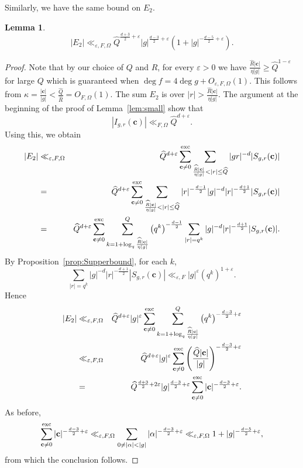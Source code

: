 \documentclass[10pt]{amsart}
\theoremstyle{plain}
\theoremstyle{plain}
\newtheorem{lemma}[theorem]{Lemma}
\renewcommand{\vec}[1]{\mathbf{#1}}
\theoremstyle{remark}
\theoremstyle{definition}
\newcommand{\hQ}{\widehat{Q}}
\newcommand{\hR}{\widehat{R}}
\newcommand{\exc}{\textup{exc}}
\begin{document}
Similarly, we have the same bound on $E_2$.
\begin{lemma}\label{lem:e2}
\[|E_2|\ll_{\varepsilon,F,\Omega} \hQ^{\frac{d+3}{2}+\varepsilon}|g|^{\frac{d-3}{2}+\varepsilon}(1+|g|^{-\frac{d-5}{2}+\varepsilon}).\]
\end{lemma}
\begin{proof}
Note that by our choice of $Q$ and $R$, for every $\varepsilon>0$ we have $\frac{\hR |\vec{c}|}{\eta |g|}\geq \hQ^{1-\varepsilon}$ for large $Q$ which is guaranteed when $\deg f=4\deg g+O_{\varepsilon,F,\Omega}(1)$. This follows from $\kappa=\frac{|\vec{c}|}{|g|}<\frac{\hQ}{\hR}=O_{F,\Omega}(1)$. The sum $E_2$ is over $|r|>\frac{\hR |\vec{c}|}{\eta |g|}$. The argument at the beginning of the proof of Lemma~\ref{lem:small} show that
\[|I_{g,r}(\vec{c})|\ll_{F,\Omega}\hQ^{d+\varepsilon}.\]
Using this, we obtain
\begin{eqnarray*}|E_2| &\ll_{\varepsilon,F,\Omega}& \hQ^{d+\varepsilon}\sum_{\vec{c}\neq 0}^{\exc}\sum_{\frac{\hR |\vec{c}|}{\eta |g|}< |r|\leq \hQ}|gr|^{-d}|S_{g,r}(\vec{c})|\\ &=&\hQ^{d+\varepsilon}\sum_{\vec{c}\neq 0}^{\exc}\sum_{\frac{\hR |\vec{c}|}{\eta |g|}< |r|\leq \hQ}|r|^{-\frac{d-1}{2}}|g|^{-d}|r|^{-\frac{d+1}{2}}|S_{g,r}(\vec{c})|\\ &=& \hQ^{d+\varepsilon}\sum_{\vec{c}\neq 0}^{\exc}\sum_{k=1+\log_q\frac{\hR |\vec{c}|}{\eta |g|}}^Q\left(q^k\right)^{-\frac{d-1}{2}}\sum_{|r|=q^k}|g|^{-d}|r|^{-\frac{d+1}{2}}|S_{g,r}(\vec{c})|.
\end{eqnarray*}
By Proposition~\ref{prop:Supperbound}, for each $k$, 
\[\sum_{|r|=q^k}|g|^{-d}|r|^{-\frac{d+1}{2}}|S_{g,r}(\vec{c})|\ll_{\varepsilon,F} |g|^{\varepsilon}(q^k)^{1+\varepsilon}.\]
Hence
\begin{eqnarray*}|E_2|&\ll_{\varepsilon,F,\Omega}& \hQ^{d+\varepsilon}|g|^{\varepsilon}\sum_{\vec{c}\neq 0}^{\exc}\sum_{k=1+\log_q\frac{\hR |\vec{c}|}{\eta |g|}}^Q\left(q^k\right)^{-\frac{d-3}{2}+\varepsilon}\\&\ll_{\varepsilon,F,\Omega}& \hQ^{d+\varepsilon}|g|^{\varepsilon}\sum_{\vec{c}\neq 0}^{\exc}\left(\frac{\hQ |\vec{c}|}{|g|}\right)^{-\frac{d-3}{2}+\varepsilon}\\&=&\hQ^{\frac{d+3}{2}+2\varepsilon}|g|^{\frac{d-3}{2}+\varepsilon}\sum_{\vec{c}\neq 0}^{\exc}|\vec{c}|^{-\frac{d-3}{2}+\varepsilon}.
\end{eqnarray*}
As before,
\[\sum_{\vec{c}\neq 0}^{\exc}|\vec{c}|^{-\frac{d-3}{2}+\varepsilon}\ll_{\varepsilon,F,\Omega} \sum_{0\neq|\alpha|<|g|}|\alpha|^{-\frac{d-3}{2}+\varepsilon}\ll_{\varepsilon,F,\Omega} 1+|g|^{-\frac{d-5}{2}+\varepsilon},\]
from which the conclusion follows.
\end{proof}
\end{document}

